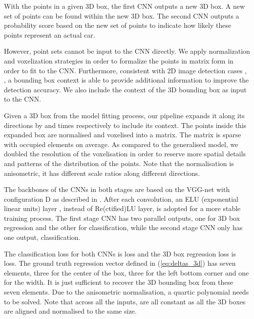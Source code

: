 \documentclass[letterpaper, 10 pt, conference]{ieeeconf}  \usepackage[
\begin{document}
With the points in a given 3D box, the first CNN outputs a new 3D box. A new set of points can be found within the new 3D box. The second CNN outputs a probability score based on the new set of points to indicate how likely these points represent an actual car.

However, point sets cannot be input to the CNN directly. We apply normalization and voxelization strategies in order to formalize the points in matrix form in order to fit to the CNN. Furthermore, consistent with 2D image detection cases \cite{bell2016inside}, \cite{cai2016unified}, a bounding box context is able to provide additional information to improve the detection accuracy. We also include the context of the 3D bounding box as input to the CNN.

Given a 3D box from the model fitting process, our pipeline expands it along its  directions by  and  times respectively to include its context. The points inside this expanded box are normalised and voxelised into a  matrix. The matrix is sparse with  occupied elements on average. As compared to the generalised model, we doubled the resolution of the voxelisation in order to reserve more spatial details and patterns of the distribution of the points. Note that the normalisation is anisometric, it has different scale ratios along different directions.

The backbones of the CNNs in both stages are based on the VGG-net with configuration D as described in \cite{simonyan2014very}. After each convolution, an ELU (exponential linear units) layer \cite{clevert2015fast}, instead of Re(ctified)LU layer, is adopted for a more stable training process. The first stage CNN has two parallel outputs, one for 3D box regression and the other for classification, while the second stage CNN only has one output, classification.


The classification loss for both CNNs is  loss and the 3D box regression loss is  loss. The ground truth regression vector  defined in (\ref{eq:deltas_3d}) has seven elements,  three for the center of the box, three for the left bottom corner and one for the width. It is just sufficient to recover the 3D bounding box from these seven elements. Due to the anisometric normalisation, a quartic polynomial needs to be solved. Note that across all the inputs,  are all constant as all the 3D boxes are aligned and normalised to the same size.
\end{document}
